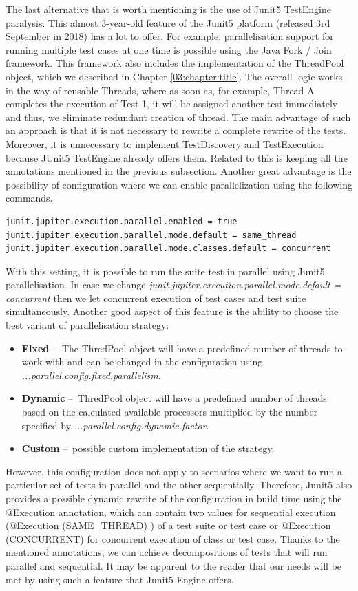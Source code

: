 The last alternative that is worth mentioning is the use of Junit5 TestEngine paralysis. This almost 3-year-old feature of the Junit5 platform (released 3rd September in 2018) has a lot to offer. For example, parallelisation support for running multiple test cases at one time is possible using the Java Fork / Join framework. This framework also includes the implementation of the ThreadPool object, which we described in Chapter \ref{03:chapter:title}. The overall logic works in the way of reusable Threads, where as soon as, for example, Thread A completes the execution of Test 1, it will be assigned another test immediately and thus, we eliminate redundant creation of thread. The main advantage of such an approach is that it is not necessary to rewrite a complete rewrite of the tests. Moreover, it is unnecessary to implement TestDiscovery and TestExecution because JUnit5 TestEngine already offers them.
Related to this is keeping all the annotations mentioned in the previous subsection. Another great advantage is the possibility of configuration where we can enable parallelization using the following commands.
\begin{verbatim}
junit.jupiter.execution.parallel.enabled = true
junit.jupiter.execution.parallel.mode.default = same_thread
junit.jupiter.execution.parallel.mode.classes.default = concurrent
\end{verbatim}
With this setting, it is possible to run the suite test in parallel using Junit5 parallelisation. In case we change \emph{junit.jupiter.execution.parallel.mode.default = concurrent} then we let concurrent execution of test cases and test suite simultaneously. Another good aspect of this feature is the ability to choose the best variant of  parallelisation strategy:
\begin{itemize}[itemsep=1mm, parsep=0pt]
    \item \textbf{Fixed} \---\ The ThredPool object will have a predefined number of threads to work with and can be changed in the configuration using \emph{...parallel.config.fixed.parallelism}.
    \item \textbf{Dynamic} \---\ ThredPool object will have a predefined number of threads based on the calculated available processors multiplied by the number specified by \emph {...parallel.config.dynamic.factor}.
    \item \textbf{Custom} \---\ possible custom implementation of the strategy.
\end{itemize}
However, this configuration does not apply to scenarios where we want to run a particular set of tests in parallel and the other sequentially. Therefore, Junit5 also provides a possible dynamic rewrite of the configuration in build time using the @Execution annotation, which can contain two values for sequential execution (@Execution (SAME\_THREAD) ) of a test suite or test case or @Execution (CONCURRENT) for concurrent execution of class or test case. Thanks to the mentioned annotations, we can achieve decompositions of tests that will run parallel and sequential.
It may be apparent to the reader that our needs will be met by using such a feature that Junit5 Engine offers.

